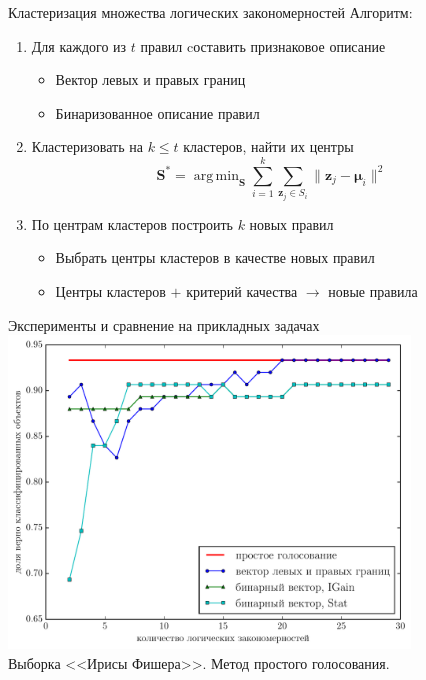 \documentclass[utf8]{beamer}
\DeclareMathOperator*{\argmin}{arg\,min}
\begin{document}
\begin{frame}{Кластеризация множества логических закономерностей}
  Алгоритм:
  \begin{enumerate}
  \item Для каждого из \(t\) правил cоставить признаковое описание
    \begin{itemize}
    \item Вектор левых и правых границ
    \item Бинаризованное описание правил
    \end{itemize}
  \item Кластеризовать на \(k\leq t\) кластеров, найти их центры
    \begin{equation*}\label{eq:quality}
      \bm{S}^* =
      \argmin_{\bm{S}}
      \sum_{i=1}^k \sum_{\bm{z}_j\in S_i} \|\bm{z}_j - \bm{\mu}_i\|^2
    \end{equation*}
  \item По центрам кластеров построить \(k\) новых правил
    \begin{itemize}
    \item Выбрать центры кластеров в качестве новых правил
    \item Центры кластеров \(+\) критерий качества \(\rightarrow\) новые правила
    \end{itemize}
  \end{enumerate}
\end{frame}

\begin{frame}{Эксперименты и сравнение на прикладных задачах}
  \centering
  \includegraphics[width=0.8\textwidth,keepaspectratio]{iris}
  \\ Выборка <<Ирисы Фишера>>. Метод простого голосования.
\end{frame}
\end{document}
